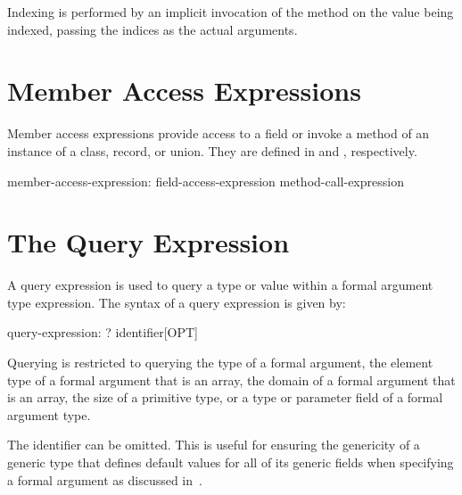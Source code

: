 Indexing is performed by an implicit invocation of the  method
on the value being indexed,
passing the indices as the actual arguments.

\section{Member Access Expressions}
\label{Member_Access_Expressions}

Member access expressions provide access to a field or invoke a method
of an instance of a class, record, or union.
They are defined in  and
, respectively.

\begin{syntax}
member-access-expression:
  field-access-expression
  method-call-expression
\end{syntax}

\section{The Query Expression}
\label{The_Query_Expression}

A query expression is used to query a type or value within a formal
argument type expression.  The syntax of a query expression is given
by:
\begin{syntax}
query-expression:
  ? identifier[OPT]
\end{syntax}
Querying is restricted to querying the type of a formal argument, the
element type of a formal argument that is an array, the domain of a
formal argument that is an array, the size of a primitive type, or a
type or parameter field of a formal argument type.

The identifier can be omitted.  This is useful for ensuring the
genericity of a generic type that defines default values for all of
its generic fields when specifying a formal argument as discussed
in~.

